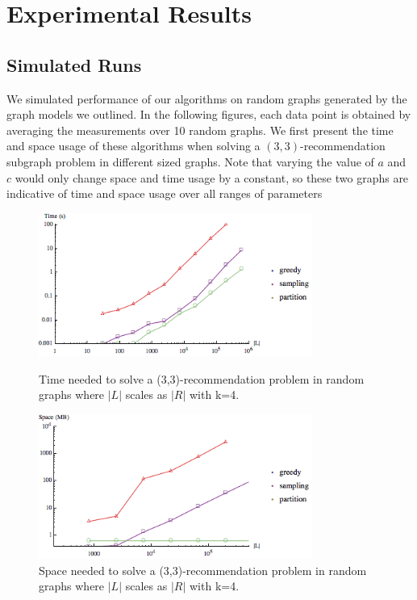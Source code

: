 \section{Experimental Results}

\subsection{Simulated Runs}
We simulated performance of our algorithms on random graphs generated
by the graph models we outlined. In the following figures, each data
point is obtained by averaging the measurements over 10 random
graphs. We first present the time and space usage of these algorithms when
solving a $(3,3)$-recommendation subgraph problem in different sized graphs.
Note that varying the value of $a$ and $c$ would only change space and time
usage by a constant, so these two graphs are indicative of time and space
usage over all ranges of parameters

\begin{figure}[t]
\centering
\begin{minipage}[h]{0.48\textwidth}
\centering
\includegraphics[width=0.8\textwidth]{images/time.png}
\caption{Time needed to solve a (3,3)-recommendation problem in random graphs where $|L|$ scales as $|R|$ with k=4.}\label{fig:time_graph}
\end{minipage}
\hspace{0cm}
\begin{minipage}[h]{0.48\textwidth}
\centering
\includegraphics[width=0.8\textwidth]{images/space.png}
\caption{Space needed to solve a (3,3)-recommendation problem in random graphs where $|L|$ scales as $|R|$ with k=4.}\label{fig:space_graph}
\end{minipage}
\vspace{-0.2in}
\end{figure}
\vs


